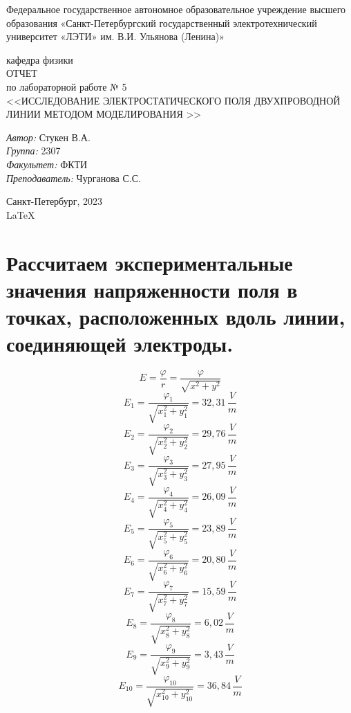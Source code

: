\documentclass[a4paper,12pt]{report}
\begin{document}
 

\begin{titlepage} 

\begin{center} 

\large Федеральное государственное автономное образовательное учреждение высшего образования «Санкт-Петербургский государственный электротехнический университет «ЛЭТИ» им. В.И. Ульянова (Ленина)»
	
кафедра физики\\[5cm] 


\huge ОТЧЕТ\\ по лабораторной работе № 5\\[0.5cm] 
\large <<ИССЛЕДОВАНИЕ
ЭЛЕКТРОСТАТИЧЕСКОГО ПОЛЯ ДВУХПРОВОДНОЙ ЛИНИИ
МЕТОДОМ МОДЕЛИРОВАНИЯ
>>\\[3.7cm]

\begin{minipage}{1\textwidth} 
    \begin{flushleft} 
        \emph{Автор:} Стукен В.А.\\
        \emph{Группа:} 2307\\
        \emph{Факультет:} ФКТИ\\
        \emph{Преподаватель:} Чурганова С.С. 
    \end{flushleft} 
\end{minipage} 

\vfill 

Санкт-Петербург, 2023\\
{\large \LaTeX} 

\end{center} 

\thispagestyle{empty} 
\end{titlepage} 

\section*{Рассчитаем экспериментальные значения напряженности поля в точках, расположенных вдоль линии, соединяющей электроды.}

\[ E = \frac{\varphi}{r} = \frac{\varphi}{\sqrt{x^2+y^2}} \]
\[ E_1 = \frac{\varphi_1}{\sqrt{x_1^2+y_1^2}} = 32,31 \, \frac{V}{m} \]
\[ E_2 = \frac{\varphi_2}{\sqrt{x_2^2+y_2^2}} = 29,76 \, \frac{V}{m} \]
\[ E_3 = \frac{\varphi_3}{\sqrt{x_3^2+y_3^2}} = 27,95 \, \frac{V}{m} \]
\[ E_4 = \frac{\varphi_4}{\sqrt{x_4^2+y_4^2}} = 26,09 \, \frac{V}{m} \]
\[ E_5 = \frac{\varphi_5}{\sqrt{x_5^2+y_5^2}} = 23,89 \, \frac{V}{m} \]
\[ E_6 = \frac{\varphi_6}{\sqrt{x_6^2+y_6^2}} = 20,80 \, \frac{V}{m} \]
\[ E_7 = \frac{\varphi_7}{\sqrt{x_7^2+y_7^2}} = 15,59 \, \frac{V}{m} \]
\[ E_8 = \frac{\varphi_8}{\sqrt{x_8^2+y_8^2}} = 6,02 \, \frac{V}{m} \]
\[ E_9 = \frac{\varphi_9}{\sqrt{x_9^2+y_9^2}} = 3,43 \, \frac{V}{m} \]
\[ E_{10} = \frac{\varphi_{10}}{\sqrt{x_{10}^2+y_{10}^2}} = 36,84 \, \frac{V}{m} \]
\end{document}
